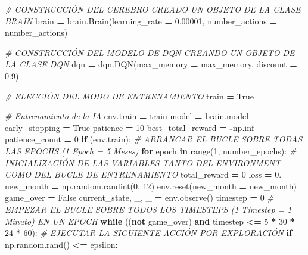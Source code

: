 \documentclass[
]{book}
\newenvironment{Shaded}{\begin{snugshade}}{\end{snugshade}}
\newcommand{\BuiltInTok}[1]{#1}
\newcommand{\CommentTok}[1]{\textcolor[rgb]{0.56,0.35,0.01}{\textit{#1}}}
\newcommand{\ControlFlowTok}[1]{\textcolor[rgb]{0.13,0.29,0.53}{\textbf{#1}}}
\newcommand{\DecValTok}[1]{\textcolor[rgb]{0.00,0.00,0.81}{#1}}
\newcommand{\FloatTok}[1]{\textcolor[rgb]{0.00,0.00,0.81}{#1}}
\newcommand{\KeywordTok}[1]{\textcolor[rgb]{0.13,0.29,0.53}{\textbf{#1}}}
\newcommand{\NormalTok}[1]{#1}
\newcommand{\OperatorTok}[1]{\textcolor[rgb]{0.81,0.36,0.00}{\textbf{#1}}}
\newcommand{\VariableTok}[1]{\textcolor[rgb]{0.00,0.00,0.00}{#1}}
\begin{document}
\begin{Shaded}
\begin{Highlighting}[]
\CommentTok{\# CONSTRUCCIÓN DEL CEREBRO CREADO UN OBJETO DE LA CLASE BRAIN}
\NormalTok{brain }\OperatorTok{=}\NormalTok{ brain.Brain(learning\_rate }\OperatorTok{=} \FloatTok{0.00001}\NormalTok{, number\_actions }\OperatorTok{=}\NormalTok{ number\_actions)}

\CommentTok{\# CONSTRUCCIÓN DEL MODELO DE DQN CREANDO UN OBJETO DE LA CLASE DQN }
\NormalTok{dqn }\OperatorTok{=}\NormalTok{ dqn.DQN(max\_memory }\OperatorTok{=}\NormalTok{ max\_memory, discount }\OperatorTok{=} \FloatTok{0.9}\NormalTok{)}

\CommentTok{\# ELECCIÓN DEL MODO DE ENTRENAMIENTO}
\NormalTok{train }\OperatorTok{=} \VariableTok{True}

\CommentTok{\# Entrenamiento de la IA}
\NormalTok{env.train }\OperatorTok{=}\NormalTok{ train}
\NormalTok{model }\OperatorTok{=}\NormalTok{ brain.model}
\NormalTok{early\_stopping }\OperatorTok{=} \VariableTok{True}
\NormalTok{patience }\OperatorTok{=} \DecValTok{10}
\NormalTok{best\_total\_reward }\OperatorTok{=} \OperatorTok{{-}}\NormalTok{np.inf}
\NormalTok{patience\_count }\OperatorTok{=} \DecValTok{0}
\ControlFlowTok{if}\NormalTok{ (env.train):}
    \CommentTok{\# ARRANCAR EL BUCLE SOBRE TODAS LAS EPOCHS (1 Epoch = 5 Meses)}
    \ControlFlowTok{for}\NormalTok{ epoch }\KeywordTok{in} \BuiltInTok{range}\NormalTok{(}\DecValTok{1}\NormalTok{, number\_epochs):}
        \CommentTok{\# INICIALIZACIÓN DE LAS VARIABLES TANTO DEL ENVIRONMENT COMO DEL BUCLE DE ENTRENAMIENTO}
\NormalTok{        total\_reward }\OperatorTok{=} \DecValTok{0}
\NormalTok{        loss }\OperatorTok{=} \FloatTok{0.}
\NormalTok{        new\_month }\OperatorTok{=}\NormalTok{ np.random.randint(}\DecValTok{0}\NormalTok{, }\DecValTok{12}\NormalTok{)}
\NormalTok{        env.reset(new\_month }\OperatorTok{=}\NormalTok{ new\_month)}
\NormalTok{        game\_over }\OperatorTok{=} \VariableTok{False}
\NormalTok{        current\_state, \_, \_ }\OperatorTok{=}\NormalTok{ env.observe()}
\NormalTok{        timestep }\OperatorTok{=} \DecValTok{0}
        \CommentTok{\# EMPEZAR EL BUCLE SOBRE TODOS LOS TIMESTEPS (1 Timestep = 1 Minuto) EN UN EPOCH}
        \ControlFlowTok{while}\NormalTok{ ((}\KeywordTok{not}\NormalTok{ game\_over) }\KeywordTok{and}\NormalTok{ timestep }\OperatorTok{\textless{}=} \DecValTok{5} \OperatorTok{*} \DecValTok{30} \OperatorTok{*} \DecValTok{24} \OperatorTok{*} \DecValTok{60}\NormalTok{):}
            \CommentTok{\# EJECUTAR LA SIGUIENTE ACCIÓN POR EXPLORACIÓN}
            \ControlFlowTok{if}\NormalTok{ np.random.rand() }\OperatorTok{\textless{}=}\NormalTok{ epsilon:}

\end{Highlighting}
\end{Shaded}
\end{document}
